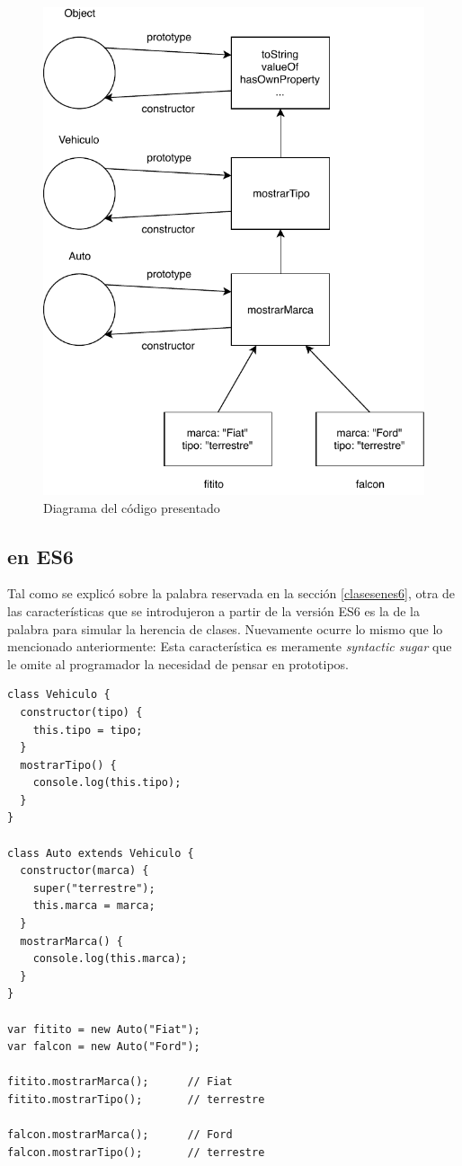 \begin{figure}[!ht]
\centering
\includegraphics{Figures/Herencia}
\decoRule
\caption[Herencia prototipada]{Diagrama del código presentado}
\label{fig:herencia}
\end{figure}

\subsection{ en ES6}

Tal como se explicó sobre la palabra reservada  en la sección \ref{clasesenes6}, otra de las características que se introdujeron a partir de la versión ES6 es la de la palabra  para simular la herencia de clases. Nuevamente ocurre lo mismo que lo mencionado anteriormente: Esta característica es meramente \textit{syntactic sugar} que le omite al programador la necesidad de pensar en prototipos. 

\begin{lstlisting}[title={\code{extends} en ES6}]
class Vehiculo {
  constructor(tipo) {
    this.tipo = tipo;
  }
  mostrarTipo() {
    console.log(this.tipo);
  }
}

class Auto extends Vehiculo {
  constructor(marca) {
    super("terrestre");
    this.marca = marca;
  }
  mostrarMarca() {
    console.log(this.marca);
  }
}

var fitito = new Auto("Fiat");
var falcon = new Auto("Ford");
     
fitito.mostrarMarca();      // Fiat
fitito.mostrarTipo();       // terrestre

falcon.mostrarMarca();      // Ford
falcon.mostrarTipo();       // terrestre
\end{lstlisting}

